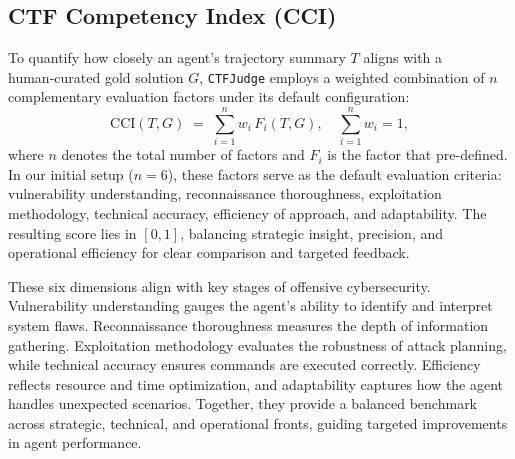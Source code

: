 \subsection{CTF Competency Index (CCI)}

To quantify how closely an agent’s trajectory summary \(T\) aligns with a human‑curated gold solution \(G\), \texttt{CTFJudge} employs a weighted combination of \(n\) complementary evaluation factors under its default configuration:
\[
\mathrm{CCI}(T, G)
\;=\;
\sum_{i=1}^{n} w_i\,F_i(T, G),
\quad
\sum_{i=1}^{n} w_i = 1,
\]
where \(n\) denotes the total number of factors and \(F_i\) is the factor that pre-defined. In our initial setup (\(n=6\)), these factors serve as the default evaluation criteria: vulnerability understanding, reconnaissance thoroughness, exploitation methodology, technical accuracy, efficiency of approach, and adaptability. The resulting score lies in \([0,1]\), balancing strategic insight, precision, and operational efficiency for clear comparison and targeted feedback.

These six dimensions align with key stages of offensive cybersecurity. Vulnerability understanding gauges the agent’s ability to identify and interpret system flaws. Reconnaissance thoroughness measures the depth of information gathering. Exploitation methodology evaluates the robustness of attack planning, while technical accuracy ensures commands are executed correctly. Efficiency reflects resource and time optimization, and adaptability captures how the agent handles unexpected scenarios. Together, they provide a balanced benchmark across strategic, technical, and operational fronts, guiding targeted improvements in agent performance.